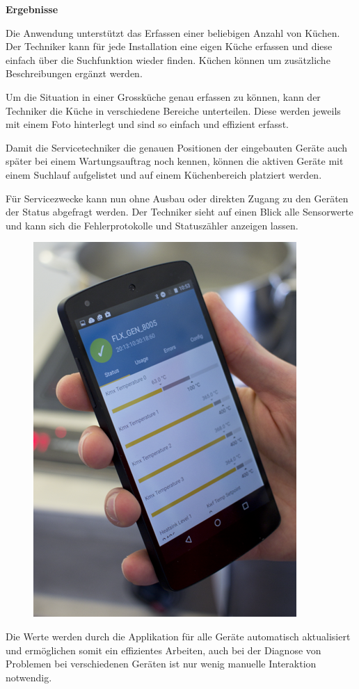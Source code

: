\textbf{Ergebnisse}

Die Anwendung unterstützt das Erfassen einer beliebigen Anzahl von Küchen. Der Techniker kann für jede Installation eine eigen Küche erfassen und diese einfach über die Suchfunktion wieder finden. Küchen können um zusätzliche Beschreibungen ergänzt werden.

Um die Situation in einer Grossküche genau erfassen zu können, kann der Techniker die Küche in verschiedene Bereiche unterteilen. Diese werden jeweils mit einem Foto hinterlegt und sind so einfach und effizient erfasst.

Damit die Servicetechniker die genauen Positionen der eingebauten Geräte auch später bei einem Wartungsauftrag noch kennen, können die aktiven Geräte mit einem Suchlauf aufgelistet und auf einem Küchenbereich platziert werden.
\WFclear

Für Servicezwecke kann nun ohne Ausbau oder direkten Zugang zu den Geräten der Status abgefragt werden. Der Techniker sieht auf einen Blick alle Sensorwerte und kann sich die Fehlerprotokolle und Statuszähler anzeigen lassen.\\
\begin{figure}
	\vspace{-.5cm}
	\begin{center}
		\includegraphics[scale=1]{start/img/img_7610}
	\end{center}
	\vspace{-1cm}
\end{figure}
Die Werte werden durch die Applikation für alle Geräte automatisch aktualisiert und ermöglichen somit ein effizientes Arbeiten, auch bei der Diagnose von Problemen bei verschiedenen Geräten ist nur wenig manuelle Interaktion notwendig.

